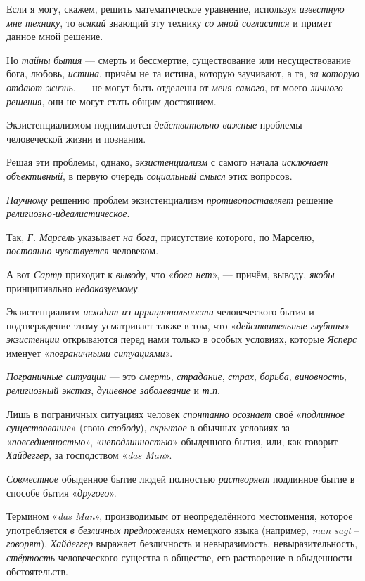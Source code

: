 \documentclass[a4paper,14pt,russian]{extreport}
\begin{document}
Если я могу, скажем, решить математическое уравнение, используя \emph{известную мне технику}, то \emph{всякий} знающий эту технику \emph{со мной согласится} и примет данное мной решение.

Но \emph{тайны} \emph{бытия} --- смерть и бессмертие, существование или несуществование бога, любовь, \emph{истина}, причём не та истина, которую заучивают, а та, \emph{за которую отдают жизнь}, --- не могут быть отделены от \emph{меня самого}, от моего \emph{личного решения}, они не могут стать общим достоянием.

Экзистенциализмом поднимаются \emph{действительно важные} проблемы человеческой жизни и познания.

Решая эти проблемы, однако, \emph{экзистенциализм} с самого начала \emph{исключает объективный}, в первую очередь \emph{социальный смысл} этих вопросов.

\emph{Научному} решению проблем экзистенциализм \emph{противопоставляет} решение \emph{религиозно-идеалистическое}.

Так, \emph{Г. Марсель} указывает \emph{на бога}, присутствие которого, по Марселю, \emph{постоянно чувствуется} человеком.

А вот \emph{Сартр} приходит к \emph{выводу}, что «\emph{бога нет}», --- причём, выводу, \emph{якобы} принципиально \emph{недоказуемому}.

Экзистенциализм \emph{исходит из иррациональности} человеческого бытия и подтверждение этому усматривает также в том, что «\emph{действительные глубины}» \emph{экзистенции} открываются перед нами только в особых условиях, которые \emph{Ясперс} именует «\emph{пограничными ситуациями}».

\emph{Пограничные ситуации} --- это \emph{смерть}, \emph{страдание}, \emph{страх}, \emph{борьба}, \emph{виновность}, \emph{религиозный экстаз}, \emph{душевное заболевание} и \emph{т.п}.

Лишь в пограничных ситуациях человек \emph{спонтанно осознает} своё «\emph{подлинное существование}» (свою \emph{свободу}), \emph{скрытое} в обычных условиях за «\emph{повседневностью}», «\emph{неподлинностью}» обыденного бытия, или, как говорит \emph{Хайдеггер}, за господством «\emph{das Man}».

\emph{Совместное} обыденное бытие людей полностью \emph{растворяет} подлинное бытие в способе бытия «\emph{другого}».

Термином «\emph{das Man}», производимым от неопределённого местоимения, которое употребляется \emph{в безличных предложениях} немецкого языка (например, \emph{man sagt} -- \emph{говорят}), \emph{Хайдеггер} выражает безличность и невыразимость, невыразительность, \emph{стёртость} человеческого существа в обществе, его растворение в обыденности обстоятельств.
\end{document}
